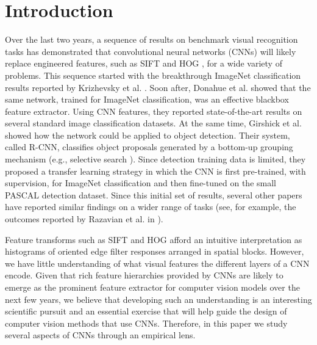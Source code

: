 \section{Introduction}

Over the last two years, a sequence of results on benchmark visual recognition tasks has demonstrated that convolutional neural networks (CNNs) \cite{fukushima1980neocognitron,Lecun89,rumelhart86} will likely replace engineered features, such as SIFT \cite{Sift} and HOG \cite{Hog}, for a wide variety of problems.
This sequence started with the breakthrough ImageNet classification results reported by Krizhevsky et al. \cite{Kriz}.
Soon after, Donahue et al. \cite{Decaf} showed that the same network, trained for ImageNet classification, was an effective blackbox feature extractor.
Using CNN features, they reported state-of-the-art results on several standard image classification datasets.
At the same time, Girshick et al. \cite{Rcnn} showed how the network could be applied to object detection.
Their system, called R-CNN, classifies object proposals generated by a bottom-up grouping mechanism (e.g., selective search \cite{UijlingsIJCV2013}).
Since detection training data is limited, they proposed a transfer learning strategy in which the CNN is first pre-trained, with supervision, for ImageNet classification and then fine-tuned on the small PASCAL detection dataset.
Since this initial set of results, several other papers have reported similar findings on a wider range of tasks (see, for example, the outcomes reported by Razavian et al. in \cite{astounding}).

Feature transforms such as SIFT and HOG afford an intuitive interpretation as histograms of oriented edge filter responses arranged in spatial blocks.
However, we have little understanding of what visual features the different layers of a CNN encode.
Given that rich feature hierarchies provided by CNNs are likely to emerge as the prominent feature extractor for computer vision models over the next few years, we believe that developing such an understanding is an interesting scientific pursuit and an essential exercise that will help guide the design of computer vision methods that use CNNs.
Therefore, in this paper we study several aspects of CNNs through an empirical lens.

